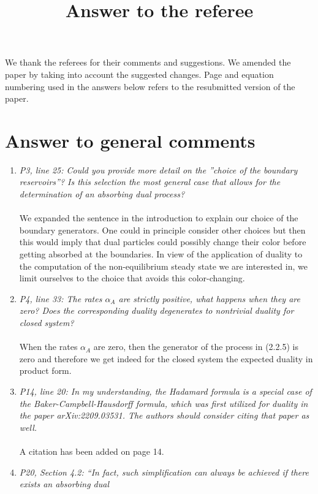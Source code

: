 \documentclass[10pt]{article}
\title{Answer to the referee
}
\numberwithin{equation}{section}
\numberwithin{equation}{subsection}
\begin{document}
		
		We thank the referees for their comments and suggestions. We amended the paper by taking into account the suggested changes.
		Page and equation numbering used in the answers below refers to the resubmitted version of the paper. 

		
		\section*{Answer to general comments}
		\begin{enumerate}
			\item \textit{P3, line 25: Could you provide more detail on the ”choice of the boundary reservoirs”? Is this selection
				the most general case that allows for the determination of an absorbing dual process?}\\ \\
				We expanded the sentence in the introduction to explain our choice of the boundary generators. One could in principle consider other choices but then this would imply that dual particles could possibly change their color before getting absorbed at the boundaries. In view of the application of duality to the computation of the non-equilibrium steady state we are interested in, we limit ourselves to the choice that avoids this color-changing.
				\item \textit{P4, line 33: The rates $\alpha_{A}$ are strictly positive, what happens when they are zero? Does the corresponding duality degenerates to nontrivial duality for closed system?} \\ \\
					When the rates $\alpha_{A}$ are zero, then the generator of the process in (2.2.5) is zero and therefore we get indeed for the closed system the expected duality in product form.
					\item \textit{P14, line 20: In my understanding, the Hadamard formula is a special case of the Baker-Campbell-Hausdorff
						formula, which was first utilized for duality in the paper arXiv:2209.03531. The authors should consider
						citing that paper as well.}\\ \\
						A citation has been added on page 14.
						\item \textit{P20, Section 4.2: “In fact, such simplification can always be achieved if there exists an absorbing dual
}
\end{enumerate}
\end{document}
